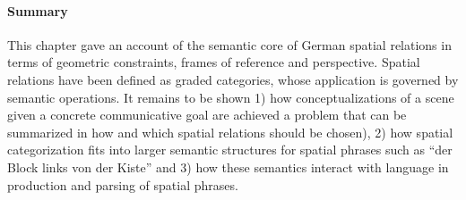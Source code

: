\paragraph*{Summary}
This chapter gave an account of the semantic core 
of German spatial relations in terms of geometric constraints,
frames of reference and perspective. Spatial relations have been
defined as graded categories, whose application is governed
by semantic operations. It remains to be shown 1) how 
conceptualizations of a scene given a concrete communicative
goal are achieved a problem that can be summarized in how and 
which spatial relations should be chosen),  2) how spatial
categorization fits into larger semantic structures for spatial
phrases such as ``der Block links von der Kiste'' and 3)
how these semantics interact with language in production 
and parsing of spatial phrases.